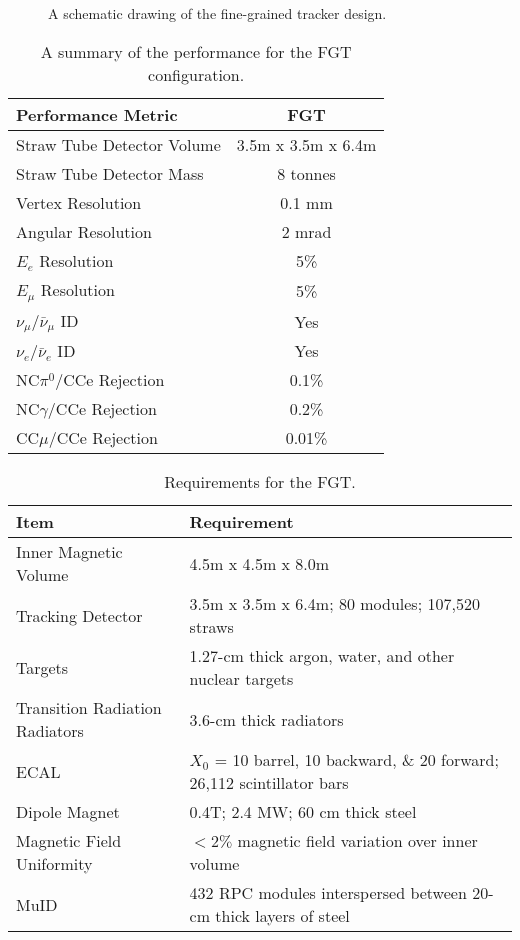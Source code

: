 \begin{figure}
\begin{center}
\caption{\label{STT_schematic} A schematic drawing of the fine-grained
tracker design.} 
\end{center}
\end{figure}

\begin{table}
\centering
  \caption{\label{tab:comparison} A summary of the performance for 
the FGT configuration.}
  \begin{tabular}{| l | c |}
    \hline
Performance Metric&FGT \\
    \hline
Straw Tube Detector Volume & 3.5m x 3.5m x 6.4m \\
Straw Tube Detector Mass&8 tonnes \\
Vertex Resolution&0.1 mm \\
Angular Resolution&2 mrad \\
$E_e$ Resolution&5\% \\
$E_\mu$ Resolution&5\% \\
$\nu_\mu/\bar \nu_\mu$ ID&Yes \\
$\nu_e/\bar \nu_e$ ID&Yes \\
NC$\pi^0$/CCe Rejection&0.1\% \\
NC$\gamma$/CCe Rejection&0.2\% \\
CC$\mu$/CCe Rejection&0.01\% \\
     \hline
  \end{tabular}
\end{table}

\begin{table}
\centering
  \caption{\label{tab:STT_specs} Requirements for the FGT.}
  \begin{tabular}{| l | l |}
    \hline
Item&Requirement \\
    \hline
Inner Magnetic Volume & 4.5m x 4.5m x 8.0m  \\
Tracking Detector & 3.5m x 3.5m x 6.4m; 80 modules; 107,520 straws \\
Targets & 1.27-cm thick argon, water, and other nuclear targets \\
Transition Radiation Radiators & 3.6-cm thick radiators \\
ECAL & $X_0$ = 10 barrel, 10 backward, \& 20 forward; 26,112 scintillator bars \\
Dipole Magnet & 0.4T; 2.4 MW; 60 cm thick steel \\
Magnetic Field Uniformity & $<2\%$ magnetic field variation over inner volume \\ 
MuID & 432 RPC modules interspersed between 20-cm thick layers of steel \\ 
     \hline
  \end{tabular}
\end{table}


